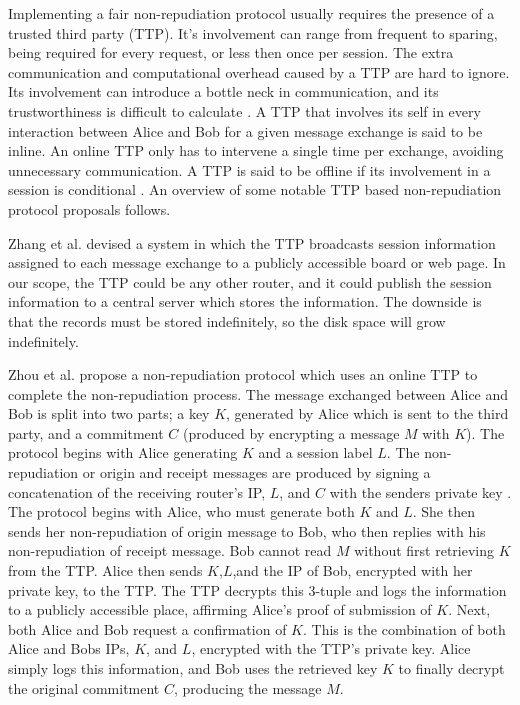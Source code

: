 \documentclass[12pt]{article}
\begin{document}
			Implementing a fair non-repudiation protocol usually requires the presence of a trusted third party (TTP)\cite{zhou1996fair}. It's involvement can range from frequent to sparing, being required for every request, or less then once per session. The extra communication and computational overhead caused by a TTP are hard to ignore. Its involvement can introduce a bottle neck in communication, and its trustworthiness is difficult to calculate \cite{Kremer20021606}. A TTP that involves its self in every interaction between Alice and Bob for a given message exchange is said to be inline. An online TTP only has to intervene a single time per exchange, avoiding unnecessary communication. A TTP is said to be offline if its involvement in a session is conditional \cite{Kremer20021606}. An overview of some notable TTP based non-repudiation protocol proposals follows.

			Zhang et al. devised a system in which the TTP broadcasts session information assigned to each message exchange to a publicly accessible board or web page\cite{zhou1996fair}. In our scope, the TTP could be any other router, and it could publish the session information to a central server which stores the information. The downside is that the records must be stored indefinitely, so the disk space will grow indefinitely\cite{zhang1996achieving}.

			Zhou et al. propose a non-repudiation protocol which uses an online TTP to complete the non-repudiation process. The message exchanged between Alice and Bob is split into two parts; a key $K$, generated by Alice which is sent to the third party, and a commitment $C$ (produced by encrypting a message $M$ with $K$). The protocol begins with Alice generating $K$ and a session label $L$. The non-repudiation or origin and receipt messages are produced by signing a concatenation of the receiving router's IP, $L$, and $C$ with the senders private key . The protocol begins with Alice, who must generate both $K$ and $L$. She then sends her non-repudiation of origin message to Bob, who then replies with his non-repudiation of receipt message. Bob cannot read $M$ without first retrieving $K$ from the TTP. Alice then sends $K$,$L$,and the IP of Bob, encrypted with her private key, to the TTP. The TTP decrypts this 3-tuple and logs the information to a publicly accessible place, affirming Alice's proof of submission of $K$. Next, both Alice and Bob request a confirmation of $K$. This is the combination of both Alice and Bobs IPs, $K$, and $L$, encrypted with the TTP's private key. Alice simply logs this information, and Bob uses the retrieved key $K$ to finally decrypt the original commitment $C$, producing the message $M$\cite{zhou1996fair}.
\end{document}
